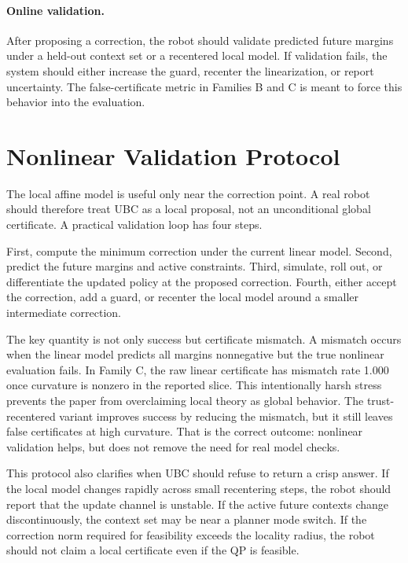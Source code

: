 \documentclass{article}
\begin{document}
\paragraph{Online validation.}
After proposing a correction, the robot should validate predicted future margins
under a held-out context set or a recentered local model. If validation fails,
the system should either increase the guard, recenter the linearization, or
report uncertainty. The false-certificate metric in Families B and C is meant to
force this behavior into the evaluation.

\section{Nonlinear Validation Protocol}

The local affine model is useful only near the correction point. A real robot
should therefore treat UBC as a local proposal, not an unconditional global
certificate. A practical validation loop has four steps.

First, compute the minimum correction under the current linear model. Second,
predict the future margins and active constraints. Third, simulate, roll out, or
differentiate the updated policy at the proposed correction. Fourth, either
accept the correction, add a guard, or recenter the local model around a smaller
intermediate correction.

The key quantity is not only success but certificate mismatch. A mismatch occurs
when the linear model predicts all margins nonnegative but the true nonlinear
evaluation fails. In Family C, the raw linear certificate has mismatch rate
1.000 once curvature is nonzero in the reported slice. This intentionally harsh
stress prevents the paper from overclaiming local theory as global behavior.
The trust-recentered variant improves success by reducing the mismatch, but it
still leaves false certificates at high curvature. That is the correct outcome:
nonlinear validation helps, but does not remove the need for real model checks.

This protocol also clarifies when UBC should refuse to return a crisp answer.
If the local model changes rapidly across small recentering steps, the robot
should report that the update channel is unstable. If the active future contexts
change discontinuously, the context set may be near a planner mode switch. If
the correction norm required for feasibility exceeds the locality radius, the
robot should not claim a local certificate even if the QP is feasible.
\end{document}

